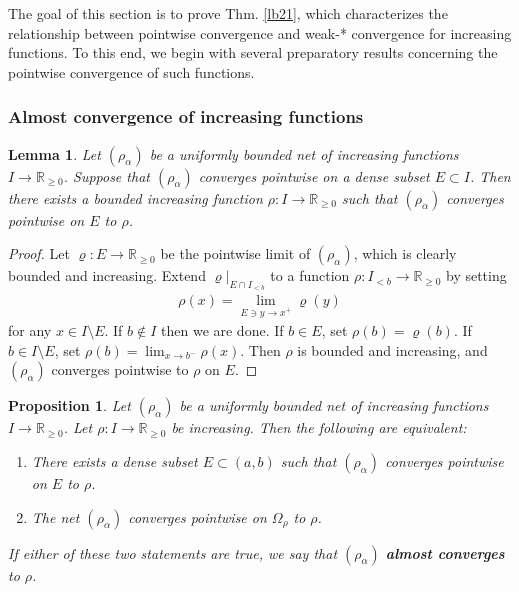 \documentclass[12pt,b5paper,notitlepage]{article}
\theoremstyle{definition}
\theoremstyle{plain}
\newtheorem{pp}[df]{Proposition}
\newtheorem{lm}[df]{Lemma}
\newcommand{\Rbb}{\mathbb R}
\numberwithin{equation}{section}
\begin{document}
The goal of this section is to prove Thm. \ref{lb21}, which characterizes the relationship between pointwise convergence and weak-* convergence for increasing functions. To this end, we begin with several preparatory results concerning the pointwise convergence of such functions.


\subsubsection{Almost convergence of increasing functions}



\begin{lm}\label{lb90}
Let $(\rho_\alpha)$ be a uniformly bounded net of increasing functions $I\rightarrow\Rbb_{\geq0}$. Suppose that $(\rho_\alpha)$ converges pointwise on a dense subset $E\subset I$. Then there exists a bounded increasing function $\rho:I\rightarrow\Rbb_{\geq0}$ such that $(\rho_\alpha)$ converges pointwise on $E$ to $\rho$.
\end{lm}

\begin{proof}
Let $\varrho:E\rightarrow\Rbb_{\geq0}$ be the pointwise limit of $(\rho_\alpha)$, which is clearly bounded and increasing. Extend $\varrho|_{E\cap I_{<b}}$ to a function $\rho:I_{<b}\rightarrow\Rbb_{\geq0}$ by setting
\begin{align*}
\rho(x)=\lim_{E\ni y\rightarrow x^+}\varrho(y)
\end{align*} 
for any $x\in I\setminus E$. If $b\notin I$ then we are done. If $b\in E$, set $\rho(b)=\varrho(b)$. If $b\in I\setminus E$, set $\rho(b)=\lim_{x\rightarrow b^-}\rho(x)$. Then $\rho$ is bounded and increasing, and $(\rho_\alpha)$ converges pointwise to $\rho$ on $E$.
\end{proof}



\begin{pp}\label{lb91}
Let $(\rho_\alpha)$ be a uniformly bounded net of increasing functions $I\rightarrow\Rbb_{\geq0}$. Let $\rho:I\rightarrow\Rbb_{\geq0}$ be increasing. Then the following are equivalent:
\begin{enumerate}[label=(\alph*)]
\item There exists a dense subset $E\subset(a,b)$ such that $(\rho_\alpha)$ converges pointwise on $E$ to $\rho$.
\item The net $(\rho_\alpha)$ converges pointwise on $\Omega_\rho$ to $\rho$.
\end{enumerate}
If either of these two statements are true, we say that $(\rho_\alpha)$ \textbf{almost converges} to $\rho$. 
\end{pp}
\end{document}
